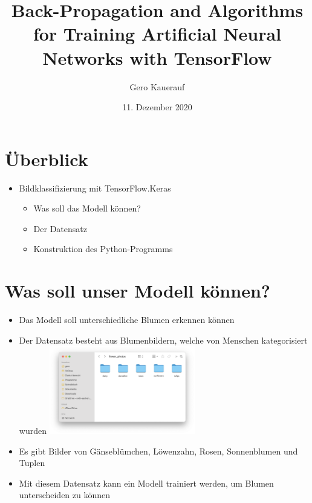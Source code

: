 \documentclass[t]{beamer}
\begin{document}

\title{Back-Propagation and Algorithms for Training Artificial Neural Networks with TensorFlow}
\date{11. Dezember 2020}
\author{Gero Kauerauf}

\frame{\titlepage}

\section{Überblick}
\begin{frame}
    \begin{itemize}
        \item Bildklassifizierung mit TensorFlow.Keras
        \begin{itemize}
            \item Was soll das Modell können?
            \item Der Datensatz
            \item Konstruktion des Python-Programms
        \end{itemize}
    \end{itemize}
\end{frame}

\section{Was soll unser Modell können?}
\begin{frame}
    \begin{itemize}
        \item Das Modell soll unterschiedliche Blumen erkennen können
        \item Der Datensatz besteht aus Blumenbildern, welche von Menschen kategorisiert wurden
        \includegraphics[width=0.5\textwidth]{teach-plots/flower-photos}
        \item Es gibt Bilder von Gänseblümchen, Löwenzahn, Rosen, Sonnenblumen und Tuplen
        \item Mit diesem Datensatz kann ein Modell trainiert werden, um Blumen unterscheiden zu können
    \end{itemize}
\end{frame}
\end{document}
